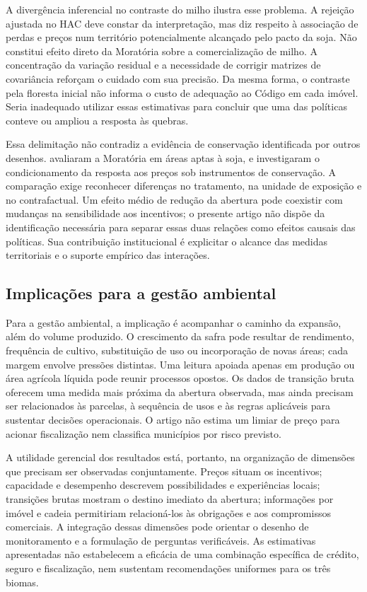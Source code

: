 A divergência inferencial no contraste do milho ilustra esse problema. A rejeição ajustada no HAC deve constar da interpretação, mas diz respeito à associação de perdas e preços num território potencialmente alcançado pelo pacto da soja. Não constitui efeito direto da Moratória sobre a comercialização de milho. A concentração da variação residual e a necessidade de corrigir matrizes de covariância reforçam o cuidado com sua precisão. Da mesma forma, o contraste pela floresta inicial não informa o custo de adequação ao Código em cada imóvel. Seria inadequado utilizar essas estimativas para concluir que uma das políticas conteve ou ampliou a resposta às quebras.

Essa delimitação não contradiz a evidência de conservação identificada por outros desenhos.  avaliaram a Moratória em áreas aptas à soja, e  investigaram o condicionamento da resposta aos preços sob instrumentos de conservação. A comparação exige reconhecer diferenças no tratamento, na unidade de exposição e no contrafactual. Um efeito médio de redução da abertura pode coexistir com mudanças na sensibilidade aos incentivos; o presente artigo não dispõe da identificação necessária para separar essas duas relações como efeitos causais das políticas. Sua contribuição institucional é explicitar o alcance das medidas territoriais e o suporte empírico das interações.

\subsection{Implicações para a gestão ambiental}

Para a gestão ambiental, a implicação é acompanhar o caminho da expansão, além do volume produzido. O crescimento da safra pode resultar de rendimento, frequência de cultivo, substituição de uso ou incorporação de novas áreas; cada margem envolve pressões distintas. Uma leitura apoiada apenas em produção ou área agrícola líquida pode reunir processos opostos. Os dados de transição bruta oferecem uma medida mais próxima da abertura observada, mas ainda precisam ser relacionados às parcelas, à sequência de usos e às regras aplicáveis para sustentar decisões operacionais. O artigo não estima um limiar de preço para acionar fiscalização nem classifica municípios por risco previsto.

A utilidade gerencial dos resultados está, portanto, na organização de dimensões que precisam ser observadas conjuntamente. Preços situam os incentivos; capacidade e desempenho descrevem possibilidades e experiências locais; transições brutas mostram o destino imediato da abertura; informações por imóvel e cadeia permitiriam relacioná-los às obrigações e aos compromissos comerciais. A integração dessas dimensões pode orientar o desenho de monitoramento e a formulação de perguntas verificáveis. As estimativas apresentadas não estabelecem a eficácia de uma combinação específica de crédito, seguro e fiscalização, nem sustentam recomendações uniformes para os três biomas.

